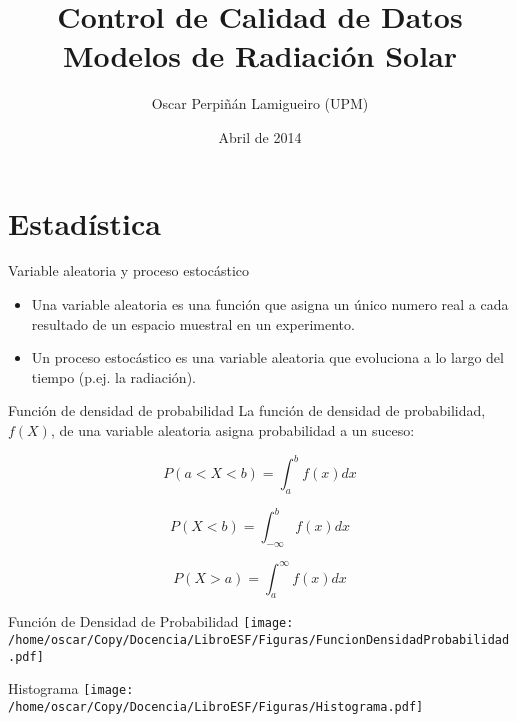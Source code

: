 \documentclass[xcolor={usenames,svgnames,dvipsnames}]{beamer}
\author{Oscar Perpiñán Lamigueiro (UPM)}
\date{Abril de 2014}
\title{Control de Calidad de Datos \\ Modelos de Radiación Solar}
\begin{document}
\maketitle

\section{Estadística}
\label{sec-1}


\begin{frame}[label=sec-1-1]{Variable aleatoria y proceso estocástico}
\begin{itemize}
\item Una \alert{variable aleatoria} es una función que asigna un único numero
real a cada resultado de un espacio muestral en un experimento.
\item Un \alert{proceso estocástico} es una variable aleatoria que evoluciona a
lo largo del \alert{tiempo} (p.ej. la radiación).
\end{itemize}
\end{frame}

\begin{frame}[label=sec-1-2]{Función de densidad de probabilidad}
La función de densidad de probabilidad, $f(X)$, de una variable
aleatoria \alert{asigna probabilidad} a un suceso:


\[
P(a<X<b)=\int_{a}^{b}f(x)dx
\]


\[
P(X<b)=\int_{-\infty}^{b}f(x)dx\]


\[
P(X>a)=\int_{a}^{\infty}f(x)dx\]
\end{frame}

\begin{frame}[label=sec-1-3]{Función de Densidad de Probabilidad}
\texttt{[image: /home/oscar/Copy/Docencia/LibroESF/Figuras/FuncionDensidadProbabilidad.pdf]}
\end{frame}
\begin{frame}[label=sec-1-4]{Histograma}
\texttt{[image: /home/oscar/Copy/Docencia/LibroESF/Figuras/Histograma.pdf]}
\end{frame}
\end{document}
